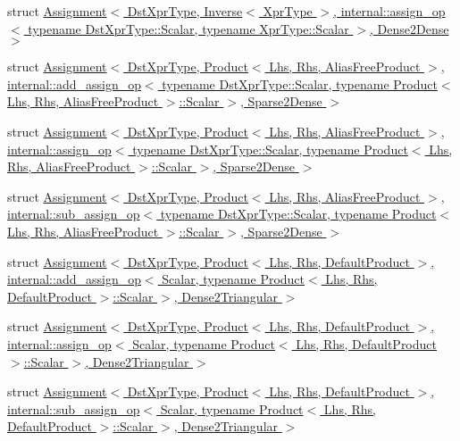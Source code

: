 \begin{DoxyCompactItemize}
struct \hyperlink{struct_eigen_1_1internal_1_1_assignment_3_01_dst_xpr_type_00_01_inverse_3_01_xpr_type_01_4_00_019b24182f99081c1fc09beae63c4c392d}{Assignment$<$ Dst\+Xpr\+Type, Inverse$<$ Xpr\+Type $>$, internal\+::assign\+\_\+op$<$ typename Dst\+Xpr\+Type\+::\+Scalar, typename Xpr\+Type\+::\+Scalar $>$, Dense2\+Dense $>$}
\item 
struct \hyperlink{struct_eigen_1_1internal_1_1_assignment_3_01_dst_xpr_type_00_01_product_3_01_lhs_00_01_rhs_00_01829d7a1a901a0be4e54bdeda694d8781}{Assignment$<$ Dst\+Xpr\+Type, Product$<$ Lhs, Rhs, Alias\+Free\+Product $>$, internal\+::add\+\_\+assign\+\_\+op$<$ typename Dst\+Xpr\+Type\+::\+Scalar, typename Product$<$ Lhs, Rhs, Alias\+Free\+Product $>$\+::\+Scalar $>$, Sparse2\+Dense $>$}
\item 
struct \hyperlink{struct_eigen_1_1internal_1_1_assignment_3_01_dst_xpr_type_00_01_product_3_01_lhs_00_01_rhs_00_01c841c32521f12d3d43fe6d566cc4cbd8}{Assignment$<$ Dst\+Xpr\+Type, Product$<$ Lhs, Rhs, Alias\+Free\+Product $>$, internal\+::assign\+\_\+op$<$ typename Dst\+Xpr\+Type\+::\+Scalar, typename Product$<$ Lhs, Rhs, Alias\+Free\+Product $>$\+::\+Scalar $>$, Sparse2\+Dense $>$}
\item 
struct \hyperlink{struct_eigen_1_1internal_1_1_assignment_3_01_dst_xpr_type_00_01_product_3_01_lhs_00_01_rhs_00_014697dd90e96dca324eed00088adc1a1c}{Assignment$<$ Dst\+Xpr\+Type, Product$<$ Lhs, Rhs, Alias\+Free\+Product $>$, internal\+::sub\+\_\+assign\+\_\+op$<$ typename Dst\+Xpr\+Type\+::\+Scalar, typename Product$<$ Lhs, Rhs, Alias\+Free\+Product $>$\+::\+Scalar $>$, Sparse2\+Dense $>$}
\item 
struct \hyperlink{struct_eigen_1_1internal_1_1_assignment_3_01_dst_xpr_type_00_01_product_3_01_lhs_00_01_rhs_00_01efc05729801ac09d27a309f4f0923f27}{Assignment$<$ Dst\+Xpr\+Type, Product$<$ Lhs, Rhs, Default\+Product $>$, internal\+::add\+\_\+assign\+\_\+op$<$ Scalar, typename Product$<$ Lhs, Rhs, Default\+Product $>$\+::\+Scalar $>$, Dense2\+Triangular $>$}
\item 
struct \hyperlink{struct_eigen_1_1internal_1_1_assignment_3_01_dst_xpr_type_00_01_product_3_01_lhs_00_01_rhs_00_0193a1d113168a246bb6cb34430a4d0595}{Assignment$<$ Dst\+Xpr\+Type, Product$<$ Lhs, Rhs, Default\+Product $>$, internal\+::assign\+\_\+op$<$ Scalar, typename Product$<$ Lhs, Rhs, Default\+Product $>$\+::\+Scalar $>$, Dense2\+Triangular $>$}
\item 
struct \hyperlink{struct_eigen_1_1internal_1_1_assignment_3_01_dst_xpr_type_00_01_product_3_01_lhs_00_01_rhs_00_01bb8efed27d47832b53496ca7f6c9254b}{Assignment$<$ Dst\+Xpr\+Type, Product$<$ Lhs, Rhs, Default\+Product $>$, internal\+::sub\+\_\+assign\+\_\+op$<$ Scalar, typename Product$<$ Lhs, Rhs, Default\+Product $>$\+::\+Scalar $>$, Dense2\+Triangular $>$}

\end{DoxyCompactItemize}
